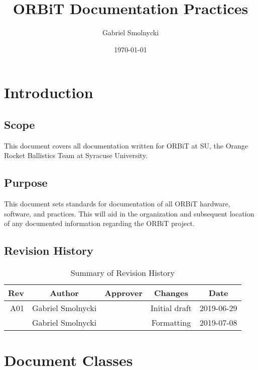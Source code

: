 \documentclass[12pt,article]{memoir}
\title{ORBiT Documentation Practices}
\author{Gabriel Smolnycki}
\date{\today}
\begin{document}


\tableofcontents*
\clearpage


\chapter{Introduction}
\section{Scope}
This document covers all documentation written for ORBiT at SU, the Orange Rocket Ballistics Team at Syracuse University.

\section{Purpose}
This document sets standards for documentation of all ORBiT hardware, software, and practices. This will aid in the organization and subsequent location of any documented information regarding the ORBiT project.

\section{Revision History}
\begin{table}[H]
	\centering
	\begin{tabu}{r || c | c | c | c }
		Rev & Author & Approver & Changes & Date\\ \hline
		A01 & Gabriel Smolnycki & & Initial draft & 2019-06-29 \\
		& Gabriel Smolnycki & & Formatting & 2019-07-08 \\
	\end{tabu}
	\caption{Summary of Revision History}
	\label{tab:rev}
\end{table}

\newpage

\chapter{Document Classes}
\end{document}
